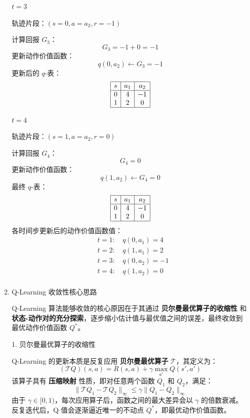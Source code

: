 \documentclass{article}
\begin{document}
\begin{enumerate}[label=(\alph*), start=1]
    \( t = 3 \)
    
    轨迹片段：\( (s=0, a=a_2, r=-1) \)  
    
    计算回报 \( G_3 \)：
    \[
    G_3 = -1 + 0 = -1
    \]
    更新动作价值函数：
    \[
    q(0, a_2) \leftarrow G_3 = -1
    \]
    更新后的 \( q \)-表：
    \[
    \begin{array}{|c|c|c|}
    	\hline
    	s & a_1 & a_2 \\
    	\hline
    	0 & 4 & -1 \\
    	1 & 2 & 0 \\
    	\hline
    \end{array}
    \]
    
    \( t = 4 \)
    
    轨迹片段：\( (s=1, a=a_2, r=0) \)  
    
    计算回报 \( G_4 \)：
    \[
    G_4 = 0
    \]
    更新动作价值函数：
    \[
    q(1, a_2) \leftarrow G_4 = 0
    \]
    最终 \( q \)-表：
    \[
    \begin{array}{|c|c|c|}
    	\hline
    	s & a_1 & a_2 \\
    	\hline
    	0 & 4 & -1 \\
    	1 & 2 & 0 \\
    	\hline
    \end{array}
    \]
    各时间步更新后的动作价值函数值：
    \[
    \begin{aligned}
    	& t=1: \quad q(0, a_1) = 4 \\
    	& t=2: \quad q(1, a_1) = 2 \\
    	& t=3: \quad q(0, a_2) = -1 \\
    	& t=4: \quad q(1, a_2) = 0 \\
    \end{aligned}
    \]
    
    \item Q-Learning 收敛性核心思路
    	
    Q-Learning 算法能够收敛的核心原因在于其通过 \textbf{贝尔曼最优算子的收缩性} 和 \textbf{状态-动作对的充分探索}，逐步缩小估计值与最优值之间的误差，最终收敛到最优动作价值函数 \( Q^* \)。
    	
    1. 贝尔曼最优算子的收缩性
    
    Q-Learning 的更新本质是反复应用 \textbf{贝尔曼最优算子} \(\mathcal{T}\)，其定义为：
    \[(\mathcal{T} Q)(s, a) = R(s, a) + \gamma \max_{a'} Q(s', a')\]
    该算子具有 \textbf{压缩映射} 性质，即对任意两个函数 \( Q_1 \) 和 \( Q_2 \)，满足：
    \[\|\mathcal{T} Q_1 - \mathcal{T} Q_2\|_\infty \leq \gamma \|Q_1 - Q_2\|_\infty\]
    由于 \(\gamma \in [0, 1)\)，每次应用算子后，函数之间的最大差异会以 \(\gamma\) 的倍数衰减。反复迭代后，Q 值会逐渐逼近唯一的不动点 \( Q^* \)，即最优动作价值函数。
    	

\end{enumerate}
\end{document}
